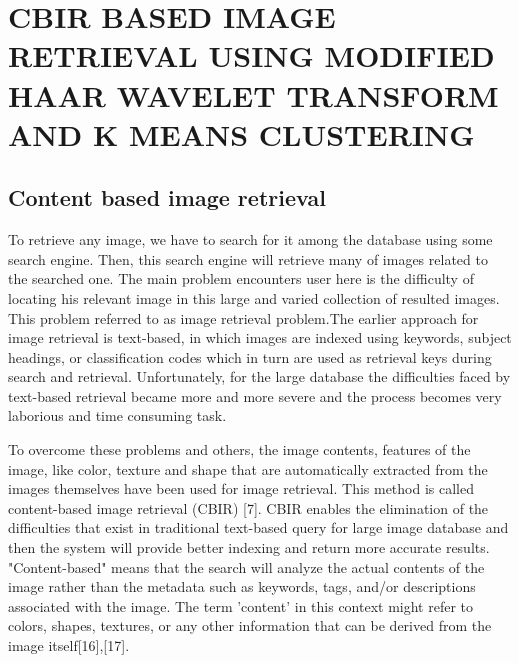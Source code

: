 \section[CBIR Based Image Retrieval Using Modified Haar Wavelet Transform and K Mean Clustering]{\fontsize{14}{12}\selectfont  CBIR BASED IMAGE RETRIEVAL USING MODIFIED HAAR WAVELET TRANSFORM AND K MEANS CLUSTERING}
\subsection[Content Based Image Retrieval]{Content based image retrieval}
\noindent
To retrieve any image, we have to search for it among the database using some search engine. Then, this search engine will retrieve many of images related to the searched one. The main problem encounters user here is the difficulty of locating his relevant image in this large and varied collection of resulted images. This problem referred to as image retrieval problem.The earlier approach for image retrieval is text-based, in which images are indexed using keywords, subject headings, or classification codes which in turn are used as retrieval keys during search and retrieval. Unfortunately, for the large database the difficulties faced by text-based retrieval became more and more severe and the process becomes very laborious and time consuming task.

  \vspace*{1pc}
To overcome these problems and others, the image contents, features of the image, like color, texture and shape that are automatically extracted from the images themselves have been used for image retrieval. This method is called content-based image retrieval (CBIR) [7]. CBIR enables the elimination of the difficulties that exist in traditional text-based query for large image database and then the system will provide better indexing and return more accurate results.
"Content-based" means that the search will analyze the actual contents of the image rather than the metadata such as keywords, tags, and/or descriptions associated with the image. The term 'content' in this context might refer to colors, shapes, textures, or any other information that can be derived from the image itself[16],[17].

